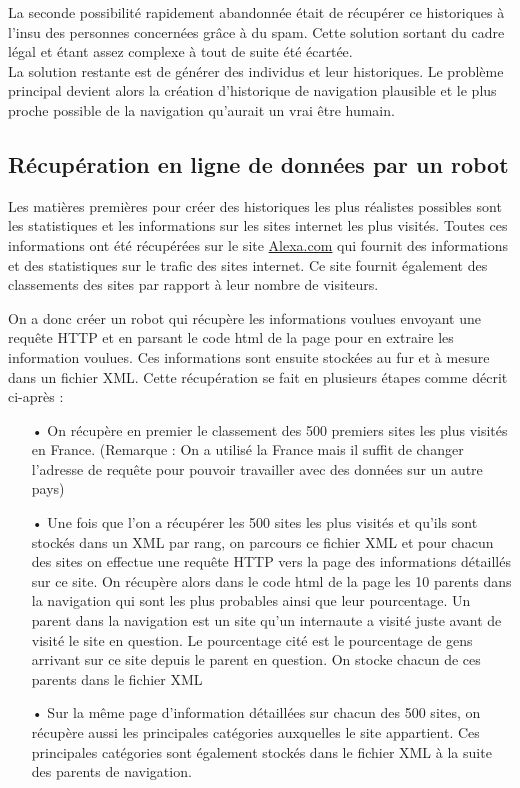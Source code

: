 \documentclass[a4paper, 11pt]{article}
\begin{document}
La seconde possibilité rapidement abandonnée était de récupérer ce historiques à l'insu des personnes concernées grâce à du spam. Cette solution sortant du cadre légal et étant assez complexe à tout de suite été écartée.\\

La solution restante est de générer des individus et leur historiques. Le problème principal devient alors la création d'historique de navigation plausible et le plus proche possible de la navigation qu'aurait un vrai être humain.

\subsection{Récupération en ligne de données par un robot}

Les matières premières pour créer des historiques les plus réalistes possibles sont les statistiques et les informations sur les sites internet les plus visités. Toutes ces informations ont été récupérées sur le site \href{http://www.alexa.com/siteinfo}{Alexa.com} qui fournit des informations et des statistiques sur le trafic des sites internet. Ce site fournit également des classements des sites par rapport à leur nombre de visiteurs.

On a donc créer un robot qui récupère les informations voulues envoyant une requête HTTP et en parsant le code html de la page pour en extraire les information voulues. Ces informations sont ensuite stockées au fur et à mesure dans un fichier XML. Cette récupération se fait en plusieurs étapes comme décrit ci-après : \\
\begin{itemize}
\item[•] On récupère en premier le classement des 500 premiers sites les plus visités en France. (Remarque : On a utilisé la France mais il suffit de changer l'adresse de requête pour pouvoir travailler avec des données sur un autre pays)
\item[•] Une fois que l'on a récupérer les 500 sites les plus visités et qu'ils sont stockés dans un XML par rang, on parcours ce fichier XML et pour chacun des sites on effectue une requête HTTP vers la page des informations détaillés sur ce site. On récupère alors dans le code html de la page les 10 parents dans la navigation qui sont les plus probables ainsi que leur pourcentage. Un parent dans la navigation est un site qu'un internaute a visité juste avant de visité le site en question. Le pourcentage cité est le pourcentage de gens arrivant sur ce site depuis le parent en question. On stocke chacun de ces parents dans le fichier XML
\item[•] Sur la même page d'information détaillées sur chacun des 500 sites, on récupère aussi les principales catégories auxquelles le site appartient. Ces principales catégories sont également stockés dans le fichier XML à la suite des parents de navigation.
\end{itemize}~\\
\end{document}
